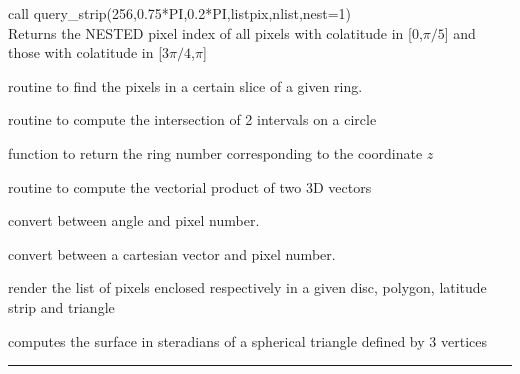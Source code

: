 \begin{example}
{
call query\_strip(256,0.75*PI,0.2*PI,listpix,nlist,nest=1)  \\
}
{
Returns the NESTED pixel index of all pixels with colatitude in
[0,$\pi/5$] and those with colatitude in [$3\pi/4$,$\pi$]
}
\end{example}
\begin{modules}
  \begin{sulist}{} %
 \item[\htmlref{in\_ring}{sub:in_ring}] routine to find the pixels in a certain slice of a given ring.		
 \item[intrs\_intrv] routine to compute the intersection of 2 intervals on a circle
 \item[\htmlref{ring\_num}{sub:ring_num}] function to return the ring number corresponding to the coordinate $z$
 \item[\htmlref{vect\_prod}{sub:vect_prod}] routine to compute the vectorial product of two 3D vectors
  \end{sulist}
\end{modules}

\begin{related}
  \begin{sulist}{} %
  \item[\htmlref{pix2ang}{sub:pix_tools}, \htmlref{ang2pix}{sub:pix_tools}] convert between angle and pixel number.
  \item[\htmlref{pix2vec}{sub:pix_tools}, \htmlref{vec2pix}{sub:pix_tools}] convert between a cartesian vector and pixel number.
  \item[\htmlref{query\_disc}{sub:query_disc}, \htmlref{query\_polygon}{sub:query_polygon},]
  \item[query\_strip, \htmlref{query\_triangle}{sub:query_triangle}] render the list of pixels enclosed
  respectively in a given disc, polygon, latitude strip and triangle
  \item[\htmlref{surface\_triangle}{sub:surface_triangle}] computes the surface
in steradians of a spherical triangle defined by 3 vertices

  \end{sulist}
\end{related}

\rule{\hsize}{2mm}

\newpage
